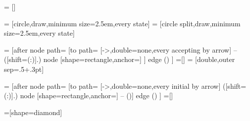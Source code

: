 %
%
%


\usetikzlibrary{shapes.multipart}%


=           []%

=  [circle,draw,minimum size=2.5em,every state]%
=     [circle split,draw,minimum size=2.5em,every state]%

=    [after node path=
{
  {
    [to path=
    {
      [->,double=none,every accepting by arrow]
      --
      ([shift=(\tikz@accepting@angle:\tikz@accepting@distance)]\tikztostart.\tikz@accepting@angle)
          node [shape=rectangle,anchor=\tikz@accepting@anchor] {\tikz@accepting@text}
      }]
    edge ()
  }
}]%
=[]%
= [double,outer sep=.5\pgflinewidth+.3pt] %

=   [after node path=
{
  {
    [to path=
    {
      [->,double=none,every initial by arrow]
      ([shift=(\tikz@initial@angle:\tikz@initial@distance)]\tikztostart.\tikz@initial@angle)
          node [shape=rectangle,anchor=\tikz@initial@anchor] {\tikz@initial@text}
        -- (\tikztostart)}]
    edge ()
  }
}]%
=[]%

=[shape=diamond]%


%
%

%
%

%
%

\def\tikz@initial@text{start}%
\def\tikz@accepting@text{}%

